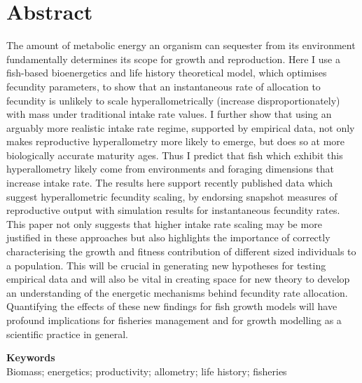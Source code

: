 \documentclass[a4paper]{article} %
\begin{document}
\section*{Abstract}\thispagestyle{plain}
    The amount of metabolic energy an organism can sequester from its environment fundamentally determines its scope for growth and reproduction. Here I use a fish-based bioenergetics and life history theoretical model, which optimises fecundity parameters, to show that an instantaneous rate of allocation to fecundity is unlikely to scale hyperallometrically (increase disproportionately) with mass under traditional intake rate values. I further show that using an arguably more realistic intake rate regime, supported by empirical data, not only makes reproductive hyperallometry more likely to emerge, but does so at more biologically accurate maturity ages. Thus I predict that fish which exhibit this hyperallometry likely come from environments and foraging dimensions that increase intake rate. The results here support recently published data which suggest hyperallometric fecundity scaling, by endorsing snapshot measures of reproductive output with simulation results for instantaneous fecundity rates. This paper not only suggests that higher intake rate scaling may be more justified in these approaches but also highlights the importance of correctly characterising the growth and fitness contribution of different sized individuals to a population. This will be crucial in generating new hypotheses for testing empirical data and will also be vital in creating space for new theory to develop an understanding of the energetic mechanisms behind fecundity rate allocation. Quantifying the effects of these new findings for fish growth models will have profound implications for fisheries management and for growth modelling as a scientific practice in general.

    \textbf{Keywords} \\
    Biomass; energetics; productivity; allometry; life history; fisheries
\end{document}
